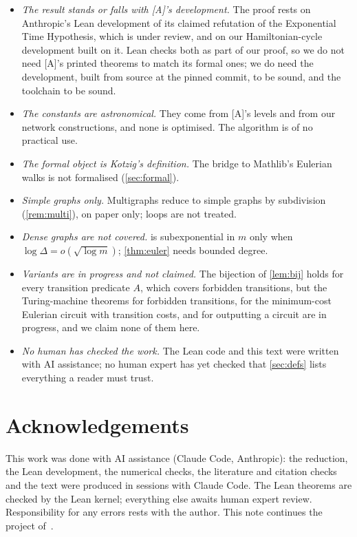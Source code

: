 \documentclass[10pt]{amsart}
\theoremstyle{plain}
\theoremstyle{definition}
\theoremstyle{remark}
\numberwithin{equation}{section}
\newcommand{\A}{\textup{[A]}}
\begin{document}
\begin{itemize}
\item \emph{The result stands or falls with \A's development.} The proof rests on Anthropic's Lean
development of its claimed refutation of the Exponential Time Hypothesis, which is under review, and
on our Hamiltonian-cycle development built on it. Lean checks both as part of our proof, so we do not
need \A's printed theorems to match its formal ones; we do need the development, built from source at
the pinned commit, to be sound, and the toolchain to be sound.
\item \emph{The constants are astronomical.} They come from \A's levels and from our network
constructions, and none is optimised. The algorithm is of no practical use.
\item \emph{The formal object is Kotzig's definition.} The bridge to Mathlib's Eulerian walks is not
formalised (\cref{sec:formal}).
\item \emph{Simple graphs only.} Multigraphs reduce to simple graphs by subdivision
(\cref{rem:multi}), on paper only; loops are not treated.
\item \emph{Dense graphs are not covered.}  is subexponential in $m$ only when
$\log\Delta=o(\sqrt{\log m})$; \cref{thm:euler} needs bounded degree.
\item \emph{Variants are in progress and not claimed.} The bijection of \cref{lem:bij} holds for every
transition predicate $A$, which covers forbidden transitions, but the Turing-machine theorems for
forbidden transitions, for the minimum-cost Eulerian circuit with transition costs, and for outputting
a circuit are in progress, and we claim none of them here.
\item \emph{No human has checked the work.} The Lean code and this text were written with AI
assistance; no human expert has yet checked that \cref{sec:defs} lists everything a reader must
trust.
\end{itemize}

\section*{Acknowledgements}
This work was done with AI assistance (Claude Code, Anthropic): the reduction, the Lean development,
the numerical checks, the literature and citation checks and the text were produced in sessions with
Claude Code. The Lean theorems are checked by the Lean kernel; everything else awaits human expert
review. Responsibility for any errors rests with the author. This note continues the project
of~\cite{Tulsyan26}.
\end{document}
